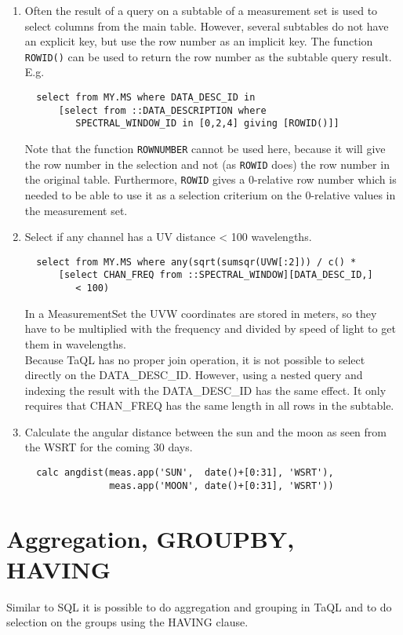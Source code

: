 \begin{enumerate}
\item
Often the result of a query on a subtable of a measurement set is
used to select columns from the main table. However, several
subtables do not have an explicit key, but use the row number as
an implicit key. The function \texttt{ROWID()} can be used to
return the row number as the subtable query result. E.g.
\begin{verbatim}
  select from MY.MS where DATA_DESC_ID in
      [select from ::DATA_DESCRIPTION where
         SPECTRAL_WINDOW_ID in [0,2,4] giving [ROWID()]] 
\end{verbatim}
Note that the function \texttt{ROWNUMBER} cannot be used here,
because it will give the row number in the selection and not
(as \texttt{ROWID} does) the row number in the original table.
Furthermore, \texttt{ROWID} gives a 0-relative row number which is
needed to be able to use it as a selection criterium on the 0-relative
values in the measurement set.

\item
Select if any channel has a UV distance < 100 wavelengths.
\begin{verbatim}
  select from MY.MS where any(sqrt(sumsqr(UVW[:2])) / c() *
      [select CHAN_FREQ from ::SPECTRAL_WINDOW][DATA_DESC_ID,]
         < 100)

\end{verbatim}
In a MeasurementSet the UVW coordinates are stored in meters, so they
have to be multiplied with the frequency and divided by speed of light
to get them in wavelengths.
\\Because TaQL has no proper join operation, it is not possible to
select directly on the DATA\_DESC\_ID. However, using a nested query and
indexing the result with the DATA\_DESC\_ID has the same effect. It only
requires that CHAN\_FREQ has the same length in all rows in the
subtable.

\item
Calculate the angular distance between the sun and the moon as seen
from the WSRT for the coming 30 days.
\begin{verbatim}
  calc angdist(meas.app('SUN',  date()+[0:31], 'WSRT'),
               meas.app('MOON', date()+[0:31], 'WSRT'))
\end{verbatim}
\end{enumerate}


\section{\label{TAQL:AGGREGATION}Aggregation, GROUPBY, HAVING}
Similar to SQL it is possible to do aggregation and grouping in TaQL
and to do selection on the groups using the HAVING clause.

